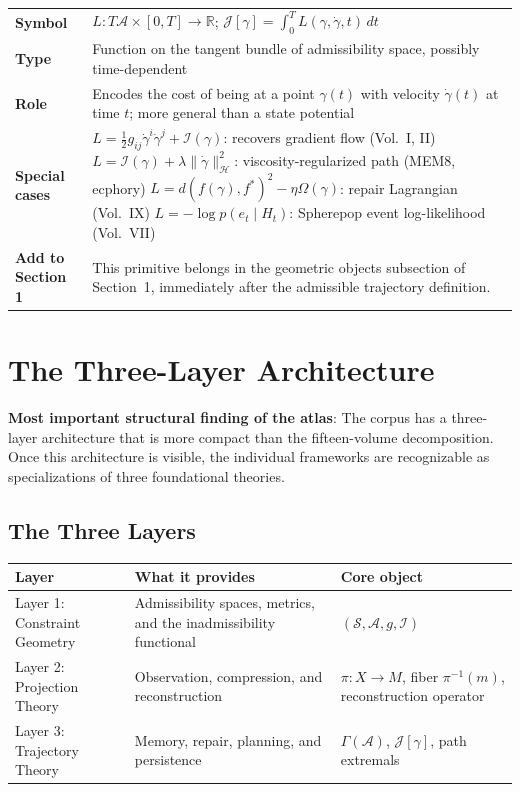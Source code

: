 \documentclass[11pt, a4paper]{article}
\begin{document}
\begin{longtable}{lp{10cm}}
\textbf{Symbol} & $L: T\mathcal{A} \times [0,T] \to \mathbb{R}$;
  $\mathcal{J}[\gamma] = \int_0^T L(\gamma, \dot\gamma, t)\,dt$ \\
\textbf{Type} & Function on the tangent bundle of admissibility space,
  possibly time-dependent \\
\textbf{Role} & Encodes the cost of being at a point $\gamma(t)$ with
  velocity $\dot\gamma(t)$ at time $t$; more general than a state potential \\
\textbf{Special cases} &
  $L = \frac{1}{2}g_{ij}\dot\gamma^i\dot\gamma^j + \mathcal{I}(\gamma)$:
  recovers gradient flow (Vol.~I, II) \newline
  $L = \mathcal{I}(\gamma) + \lambda\|\dot\gamma\|_\mathcal{H}^2$:
  viscosity-regularized path (MEM\textbar{}8, ecphory) \newline
  $L = d(f(\gamma), f^*)^2 - \eta\Omega(\gamma)$:
  repair Lagrangian (Vol.~IX) \newline
  $L = -\log p(e_t \mid H_t)$:
  Spherepop event log-likelihood (Vol.~VII) \\
\textbf{Add to Section 1} & This primitive belongs in the geometric
  objects subsection of Section~1, immediately after the admissible
  trajectory definition. \\
\end{longtable}

\section{The Three-Layer Architecture}

\begin{notebox}
\textbf{Most important structural finding of the atlas}: The corpus
has a three-layer architecture that is more compact than the
fifteen-volume decomposition. Once this architecture is visible,
the individual frameworks are recognizable as specializations of
three foundational theories.
\end{notebox}

\subsection{The Three Layers}

\medskip
\begin{longtable}{p{3cm}p{4cm}p{6cm}}
\toprule
\textbf{Layer} & \textbf{What it provides} & \textbf{Core object} \\
\midrule
Layer 1: Constraint Geometry &
  Admissibility spaces, metrics, and the inadmissibility functional &
  $(\mathcal{S}, \mathcal{A}, g, \mathcal{I})$ \\
Layer 2: Projection Theory &
  Observation, compression, and reconstruction &
  $\pi: X \to M$, fiber $\pi^{-1}(m)$, reconstruction operator \\
Layer 3: Trajectory Theory &
  Memory, repair, planning, and persistence &
  $\Gamma(\mathcal{A})$, $\mathcal{J}[\gamma]$, path extremals \\
\bottomrule
\end{longtable}
\end{document}
